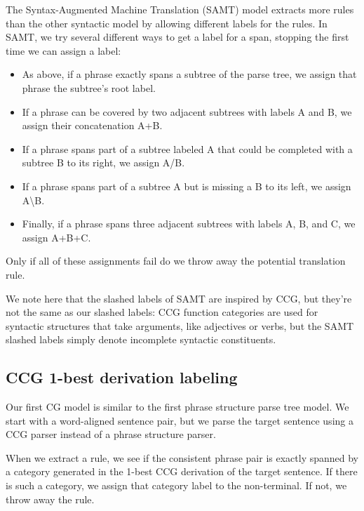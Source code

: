 \documentclass[a4paper]{article}
\begin{document}
The Syntax-Augmented Machine Translation (SAMT) model \cite{samt-wmt06} extracts more rules than the other syntactic model by allowing different labels for the rules. In SAMT, we try several different ways to get a label for a span, stopping the first time we can assign a label:
\begin{itemize}
\item As above, if a phrase exactly spans a subtree of the parse tree, we assign that phrase the subtree's root label.
\item If a phrase can be covered by two adjacent subtrees with labels A and B, we assign their concatenation A+B.
\item If a phrase spans part of a subtree labeled A that could be completed with a subtree B to its right, we assign A/B.
\item If a phrase spans part of a subtree A but is missing a B to its left, we assign A\textbackslash B.
\item Finally, if a phrase spans three adjacent subtrees with labels A, B, and C, we assign A+B+C.
\end{itemize}
Only if all of these assignments fail do we throw away the potential translation rule.

We note here that the slashed labels of SAMT are inspired by CCG, but they're not the same as our slashed labels: CCG function categories are used for syntactic structures that take arguments, like adjectives or verbs, but the SAMT slashed labels simply denote incomplete syntactic constituents.

\subsection{CCG 1-best derivation labeling}

Our first CG model is similar to the first phrase structure parse tree model. We start with a word-aligned sentence pair, but we parse the target sentence using a CCG parser instead of a phrase structure parser.

When we extract a rule, we see if the consistent phrase pair is exactly spanned by a category generated in the 1-best CCG derivation of the target sentence. If there is such a category, we assign that category label to the non-terminal. If not, we throw away the rule.
\end{document}
